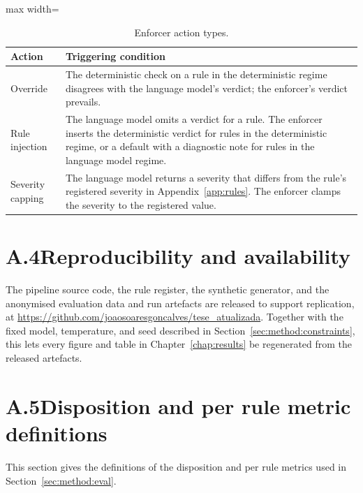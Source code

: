 \begin{table}[htbp]
\centering
\caption{Enforcer action types.}
\label{tab:method:actions}
\footnotesize
\begin{adjustbox}{max width=\textwidth}
\begin{tabular}{@{}lp{11cm}@{}}
\toprule
\textbf{Action} & \textbf{Triggering condition} \\
\midrule
Override          & The deterministic check on a rule in the deterministic regime disagrees with the language model's verdict; the enforcer's verdict prevails. \\
Rule injection    & The language model omits a verdict for a rule. The enforcer inserts the deterministic verdict for rules in the deterministic regime, or a default with a diagnostic note for rules in the language model regime. \\
Severity capping  & The language model returns a severity that differs from the rule's registered severity in Appendix~\ref{app:rules}. The enforcer clamps the severity to the registered value. \\
\bottomrule
\end{tabular}
\end{adjustbox}
\end{table}


\section*{A.4\quad Reproducibility and availability}
\label{app:repro}

The pipeline source code, the rule register, the synthetic generator, and the anonymised evaluation data and run artefacts are released to support replication, at \url{https://github.com/joaosoaresgoncalves/tese_atualizada}. Together with the fixed model, temperature, and seed described in Section~\ref{sec:method:constraints}, this lets every figure and table in Chapter~\ref{chap:results} be regenerated from the released artefacts.


\section*{A.5\quad Disposition and per rule metric definitions}
\label{app:metrics}

This section gives the definitions of the disposition and per rule metrics used in Section~\ref{sec:method:eval}.

